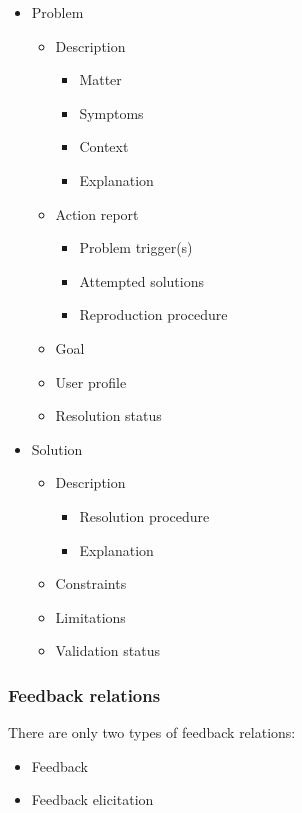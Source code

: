 \begin{itemize}
	\item Problem
		\begin{itemize}
			\item Description
				\begin{itemize}
					\item Matter
					\item Symptoms
					\item Context
					\item Explanation
				\end{itemize}
			\item Action report
				\begin{itemize}
					\item Problem trigger(s)
					\item Attempted solutions
					\item Reproduction procedure
				\end{itemize}
			\item Goal
			\item User profile
			\item Resolution status
		\end{itemize}
	\item Solution
		\begin{itemize}
			\item Description 
				\begin{itemize}
					\item Resolution procedure
					\item Explanation
				\end{itemize}
			\item Constraints
			\item Limitations
			\item Validation status
		\end{itemize}
\end{itemize}

\subsubsection{Feedback relations}
\label{subsubsec:rhetorical_relations}

There are only two types of feedback relations:

\begin{itemize}
	\item Feedback
	\item Feedback elicitation
\end{itemize}

